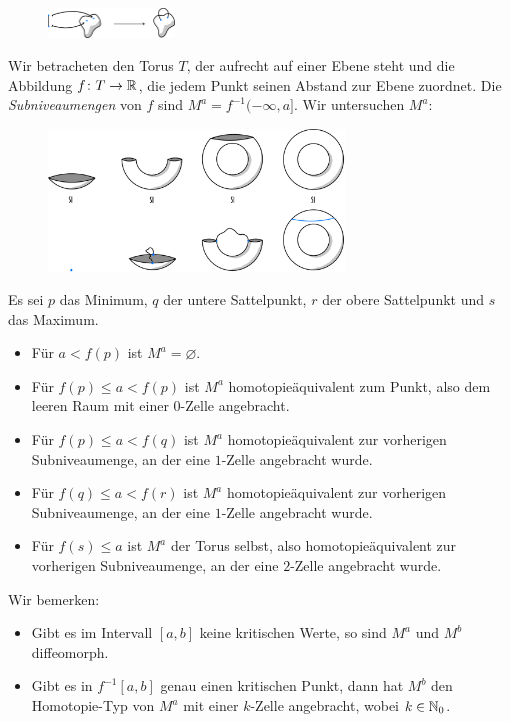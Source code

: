 \documentclass[a4paper,11pt,twoside]{scrreport}
\begin{document}
\begin{figure}[H]
    \centering
    \includegraphics[width=0.3\textwidth]{../resources/Me-Diagram1-attaching-a-1-cell.jpeg}
\end{figure}

Wir betracheten den Torus $T$, der aufrecht auf einer Ebene steht und die Abbildung 
$f \colon T \to { \mathbb R }$, die jedem Punkt seinen Abstand zur Ebene zuordnet.
Die \textit{Subniveaumengen} von $f$ sind $M^a = f^{-1} (-\infty, a]$. Wir untersuchen $M^a$:

\begin{figure}[H]
    \centering
    \includegraphics[width=0.7\textwidth]{../resources/Me-Diagram3-torus-example.jpeg}
\end{figure}

Es sei $p$ das Minimum, $q$ der untere Sattelpunkt, $r$ der obere Sattelpunkt und $s$ das Maximum.

\begin{itemize}
    \item Für $a < f(p)$ ist $M^a = \varnothing$.
    \item Für $f(p) \leq a < f(p)$ ist $M^a$ homotopieäquivalent zum Punkt,
        also dem leeren Raum mit einer $0$-Zelle angebracht.
    \item Für $f(p) \leq a < f(q)$ ist $M^a$ homotopieäquivalent zur vorherigen
        Subniveaumenge, an der eine $1$-Zelle angebracht wurde.
    \item Für $f(q) \leq a < f(r)$ ist $M^a$ homotopieäquivalent zur vorherigen
        Subniveaumenge, an der eine $1$-Zelle angebracht wurde.
    \item Für $f(s) \leq a$ ist $M^a$ der Torus selbst, also homotopieäquivalent zur 
        vorherigen Subniveaumenge, an der eine $2$-Zelle angebracht wurde.
\end{itemize}

Wir bemerken: 
\begin{itemize}
    \item Gibt es im Intervall $[a, b]$ keine kritischen Werte, so sind $M^a$ und
        $M^b$ diffeomorph.
    \item Gibt es in $f^{-1}[a, b]$ genau einen kritischen Punkt, dann hat $M^b$ 
        den Homotopie-Typ von $M^a$ mit einer $k$-Zelle angebracht, wobei 
        $k \in { \mathbb N }_0$.
\end{itemize}
\end{document}
